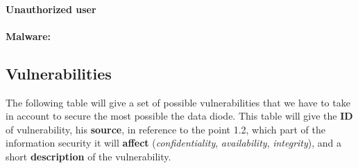 \documentclass[a4paper,10pt]{article}
\begin{document}
\paragraph{Unauthorized user}

\paragraph{Malware:} 




\subsection{Vulnerabilities}

 The following table will give a set of possible vulnerabilities that we have to take in account to secure the most possible the data diode. This table will give the \textbf{ID} of vulnerability, his \textbf{source}, in reference to the point 1.2, which part of the information security it will \textbf{affect} (\textit{confidentiality}, \textit{availability}, \textit{integrity}), and a short \textbf{description} of the vulnerability.
\end{document}
